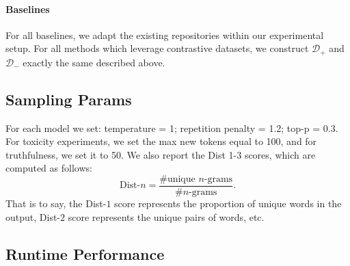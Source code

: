 \documentclass{article}
\newcommand{\mc}{\mathcal}
\theoremstyle{plain}
\theoremstyle{definition}
\theoremstyle{remark}
\begin{document}
\paragraph{Baselines} For all baselines, we adapt the existing repositories within our experimental setup. For all methods which leverage contrastive datasets, we construct $\mc D_+$ and $\mc D_-$ exactly the same described above. 

\subsection{Sampling Params}
For each model we set: temperature = 1; repetition penalty = 1.2; top-p = 0.3.
For toxicity experiments, we set the max new tokens equal to 100, and for truthfulness, we set it to 50. 
We also report the Dist 1-3 scores, which are computed as follows:
\begin{equation}
    \text{Dist-}n = \frac{\text{\# unique } n\text{-grams}}{\text{\# } n\text{-grams}}.
\end{equation}
That is to say, the Dist-$1$ score represents the proportion of unique words in the output, Dist-$2$ score represents the unique pairs of words, etc. 

\subsection{Runtime Performance}
\end{document}
